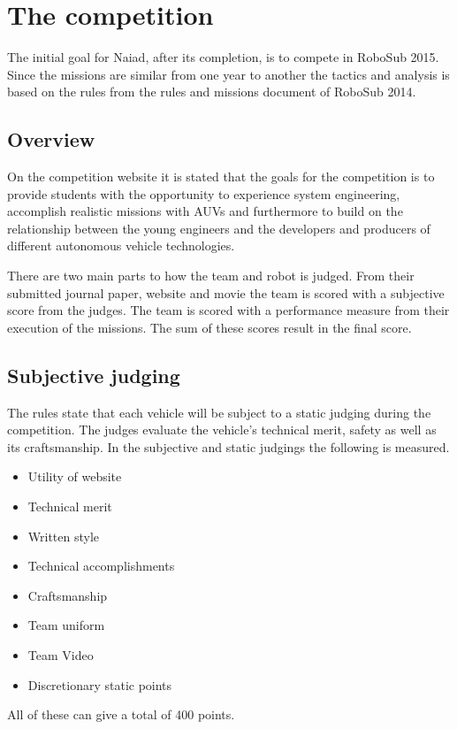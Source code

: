 \section{The competition}
\label{competition}
\noindent
The initial goal for Naiad, after its completion, is to compete in RoboSub 2015. Since the missions are similar from one year to another the tactics and analysis is based on the rules from the rules and missions document of RoboSub 2014.\cite{robosubrules}
	\subsection{Overview}
\noindent 
On the competition website it is stated that the goals for the competition is to provide students with the opportunity to experience system engineering, accomplish realistic missions with AUVs and furthermore to build on the relationship between the young engineers and the developers and producers of different autonomous vehicle technologies.\cite{robosub}

There are two main parts to how the team and robot is judged. From their submitted journal paper, website and movie the team is scored with a subjective score from the judges. The team is scored with a performance measure from their execution of the missions. The sum of these scores result in the final score.
	\subsection{Subjective judging}
\noindent The rules state that each vehicle will be subject to a static judging during the competition. The judges evaluate the vehicle's technical merit, safety as well as its craftsmanship.  In the subjective and static judgings the following is measured.  

\begin{itemize}\itemsep1pt \parskip0pt 
\item Utility of website
\item Technical merit
\item Written style
\item Technical accomplishments
\item Craftsmanship
\item Team uniform
\item Team Video
\item Discretionary static points
\end{itemize}
All of these can give a total of 400 points. 

